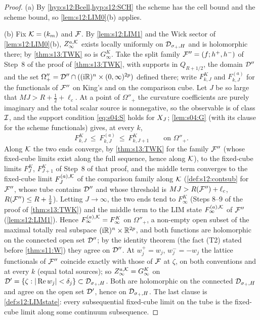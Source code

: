 \begin{proof}
(a) By \cref{hyp:s12:Bcell,hyp:s12:SCH} the scheme has the cell bound and the scheme bound, so \cref{lem:s12:LIM0}(b) applies.

(b) Fix $\mathcal K=(k_m)$ and $\mathcal F$. By \cref{lem:s12:LIM1} and the Wick sector of \cref{lem:s12:LIM0}(b), $Z^{a,\mathcal K}_\infty$ exists locally uniformly on $\mathcal D_{\sigma_+,H}$ and is holomorphic there; by \cref{thm:s13:TWK} so is $G^K_\infty$. Take the split family $\mathcal F''=(f;h^+,h^-)$ of Step~8 of the proof of \cref{thm:s13:TWK}, with supports in $Q_{R+1/2}$, the domain $\mathcal D''$ and the set $\Omega''_+=\mathcal D''\cap((\mathrm i\mathbb R)^n\times(0,\infty)^{2p})$ defined there; write $F^K_{k,J}$ and $F^{(a)}_{k,J}$ for the functionals of $\mathcal F''$ on King's and on the comparison cube. Let $J$ be so large that $MJ>R+\frac12+\ell_c$. At a point of $\Omega''_+$ the curvature coefficients are purely imaginary and the total scalar source is nonnegative, so the observable is of class $\mathcal I$, and the support condition \eqref{eq:s04:S} holds for $X_J$; \cref{lem:s04:G} (with its clause for the scheme functionals) gives, at every $k$,
\[
F^K_{k,J}\ \le\ F^{(a)}_{k,J}\ \le\ F^K_{k,J+1}\qquad\text{on }\Omega''_+ .
\]
Along $\mathcal K$ the two ends converge, by \cref{thm:s13:TWK} for the family $\mathcal F''$ (whose fixed-cube limits exist along the full sequence, hence along $\mathcal K$), to the fixed-cube limits $F^K_J$, $F^K_{J+1}$ of Step~8 of that proof, and the middle term converges to the fixed-cube limit $F^{(a),\mathcal K}_J$ of the comparison family along $\mathcal K$ (\cref{def:s12:contsub} for $\mathcal F''$, whose tube contains $\mathcal D''$ and whose threshold is $MJ>R(\mathcal F'')+\ell_c$, $R(\mathcal F'')\le R+\frac12$). Letting $J\to\infty$, the two ends tend to $F^K_\infty$ (Steps 8--9 of the proof of \cref{thm:s13:TWK}) and the middle term to the LIM state $F^{(a),\mathcal K}_\infty$ of $\mathcal F''$ (\cref{lem:s12:LIM1}). Hence $F^{(a),\mathcal K}_\infty=F^K_\infty$ on $\Omega''_+$, a non-empty open subset of the maximal totally real subspace $(\mathrm i\mathbb R)^n\times\mathbb R^{2p}$, and both functions are holomorphic on the connected open set $\mathcal D''$; by the identity theorem (the fact (T2) stated before \cref{thm:s11:W}) they agree on $\mathcal D''$. At $w^+_j=w_j$, $w^-_j=-w_j$ the lattice functionals of $\mathcal F''$ coincide exactly with those of $\mathcal F$ at $\zeta$, on both conventions and at every $k$ (equal total sources); so $Z^{a,\mathcal K}_\infty=G^K_\infty$ on $\mathcal D'=\{\zeta:|\operatorname{Re} w_j|<\delta_j\}\subset\mathcal D_{\sigma_+,H}$. Both are holomorphic on the connected $\mathcal D_{\sigma_+,H}$ and agree on the open set $\mathcal D'$, hence on $\mathcal D_{\sigma_+,H}$. The last clause is \cref{def:s12:LIMstate}: every subsequential fixed-cube limit on the tube is the fixed-cube limit along some continuum subsequence.
\end{proof}
